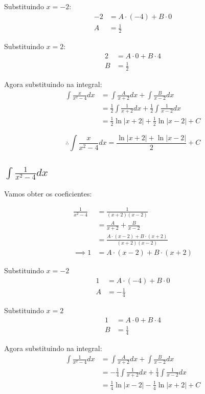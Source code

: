 \documentclass[12pt]{article}
\theoremstyle{definition}
\begin{document}
Substituindo \(x = -2 \):
\begin{align*}
    -2
    &= A \cdot (-4) + B \cdot 0 \\
    A &= \frac{1}{2}
\end{align*}

Substituindo \(x = 2\):
\begin{align*}
    2
    &= A \cdot 0 + B \cdot 4 \\
    B &= \frac{1}{2}
\end{align*}

Agora substituindo na integral:
\begin{align*}
    \int{\frac{x}{x^2-4}dx}
    &= \int{\frac{A}{x+2}dx} + \int{\frac{B}{x-2}dx} \\
    &= \frac{1}{2}\int{\frac{1}{x+2}dx} + \frac{1}{2}\int{\frac{1}{x-2}dx} \\
    &= \frac{1}{2}\ln{|x+2|} + \frac{1}{2}\ln{|x-2|} + C
\end{align*}

\[
    \boxed{
        \therefore \int{\frac{x}{x^2-4}dx} = \frac{\ln{|x+2| + \ln{|x-2|}}}{2} + C
    }
\]

\subsection{\(\int{\frac{1}{x^2-4}dx}\)}
Vamos obter os coeficientes:

\begin{align*}
    \frac{1}{x^2-4}
    &= \frac{1}{(x+2)(x-2)} \\
    &= \frac{A}{x+2} + \frac{B}{x-2} \\
    &= \frac{A\cdot (x-2) + B\cdot (x+2)}{(x+2)(x-2)} \\
    \implies 1
    &= A\cdot (x-2) + B\cdot (x+2)
\end{align*}

Substituindo \(x = -2\)
\begin{align*}
    1
    &= A\cdot (-4) + B\cdot 0 \\
    A &= -\frac{1}{4}
\end{align*}

Substituindo \(x = 2\)
\begin{align*}
    1
    &= A \cdot 0 + B \cdot 4 \\
    B &= \frac{1}{4}
\end{align*}

Agora substituindo na integral:
\begin{align*}
    \int{\frac{1}{x^2-4}dx}
    &= \int{\frac{A}{x+2}dx} + \int{\frac{B}{x-2}dx} \\
    &= - \frac{1}{4} \int{\frac{1}{x+2}dx} + \frac{1}{4} \int{\frac{1}{x-2}dx} \\
    &= \frac{1}{4}\ln{|x-2|} - \frac{1}{4}\ln{|x+2|} + C
\end{align*}
\end{document}
